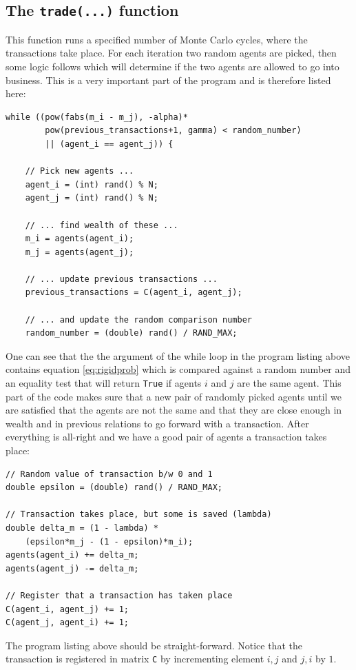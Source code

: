 \documentclass[10pt, a4paper]{amsart}
\begin{document}
\subsection{The \lstinline|trade(...)| function}
This function runs a specified number of Monte Carlo cycles, where the transactions take place. For each iteration two random agents are picked, then some logic follows which will determine if the two agents are allowed to go into business. This is a very important part of the program and is therefore listed here:
\begin{lstlisting}
while ((pow(fabs(m_i - m_j), -alpha)*
		pow(previous_transactions+1, gamma) < random_number)
		|| (agent_i == agent_j)) {
      
	// Pick new agents ...
	agent_i = (int) rand() % N;
	agent_j = (int) rand() % N;

	// ... find wealth of these ...
	m_i = agents(agent_i);
	m_j = agents(agent_j);

	// ... update previous transactions ...
	previous_transactions = C(agent_i, agent_j);

	// ... and update the random comparison number
	random_number = (double) rand() / RAND_MAX;
\end{lstlisting}
One can see that the the argument of the while loop in the program listing above contains equation \ref{eq:rigidprob} which is compared against a random number and an equality test that will return \lstinline|True| if agents $i$ and $j$ are the same agent. This part of the code makes sure that a new pair of randomly picked agents until we are satisfied that the agents are not the same and that they are close enough in wealth and in previous relations to go forward with a transaction. After everything is all-right and we have a good pair of agents a transaction takes place:
\begin{lstlisting}
// Random value of transaction b/w 0 and 1
double epsilon = (double) rand() / RAND_MAX;

// Transaction takes place, but some is saved (lambda)
double delta_m = (1 - lambda) * 
	(epsilon*m_j - (1 - epsilon)*m_i);
agents(agent_i) += delta_m;
agents(agent_j) -= delta_m;

// Register that a transaction has taken place
C(agent_i, agent_j) += 1;
C(agent_j, agent_i) += 1;
\end{lstlisting}
The program listing above should be straight-forward. Notice that the transaction is registered in matrix \lstinline|C| by incrementing element $i,j$ and $j,i$ by $1$.
\end{document}
